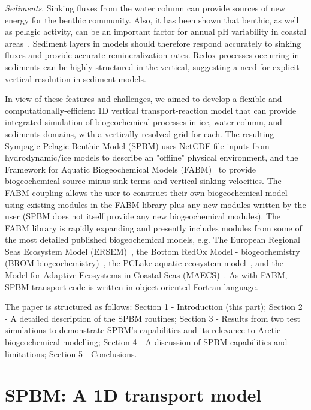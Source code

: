 \documentclass[gmd, manuscript]{copernicus}
\begin{document}
\emph{Sediments}.
Sinking fluxes from the water column can provide sources of new energy for the benthic community.
Also, it has been shown that benthic, as well as pelagic activity,  can be an important factor for annual pH variability in coastal areas~\citep{Blackford2007}.
Sediment layers in models should therefore respond accurately to sinking fluxes and provide accurate remineralization rates.
Redox processes occurring in sediments can be highly structured in the vertical, suggesting a need for explicit vertical resolution in sediment models.

In view of these features and challenges, we aimed to develop a flexible and computationally-efficient 1D vertical transport-reaction model that can provide integrated simulation of biogeochemical processes in ice, water column, and sediments domains, with a vertically-resolved grid for each.
The resulting Sympagic-Pelagic-Benthic Model (\textrm{SPBM}) uses \textrm{NetCDF} file inputs from hydrodynamic/ice models to describe an "offline" physical environment, and the Framework for Aquatic Biogeochemical Models (\textrm{FABM})~\citep{Bruggeman2014} to provide biogeochemical source-minus-sink terms and vertical sinking velocities.
The \textrm{FABM} coupling allows the user to construct their own biogeochemical model using existing modules in the \textrm{FABM} library plus any new modules written by the user (\textrm{SPBM} does not itself provide any new biogeochemical modules).
The \textrm{FABM} library is rapidly expanding and presently includes modules from some of the most detailed published biogeochemical models, e.g. The European Regional Seas Ecosystem Model (\textrm{ERSEM})~\citep{ersem2016}, the Bottom RedOx Model - biogeochemistry (\textrm{BROM}-biogeochemistry)~\citep{Yakushev2017}, the PCLake aquatic ecosystem model~\citep{Hu2016}, and the Model for Adaptive Ecosystems in Coastal Seas (\textrm{MAECS})~\citep{Wirtz2016, Kerimoglu2017}.
As with \textrm{FABM}, \textrm{SPBM} transport code is written in object-oriented Fortran language.

The paper is structured as follows:
Section 1 - Introduction (this part);
Section 2 - A detailed description of the \textrm{SPBM} routines;
Section 3 - Results from two test simulations to demonstrate \textrm{SPBM}'s capabilities and its relevance to Arctic biogeochemical modelling;
Section 4 - A discussion of \textrm{SPBM} capabilities and limitations;
Section 5 - Conclusions.

\section{\textrm{SPBM}: A 1D transport model}
\end{document}
